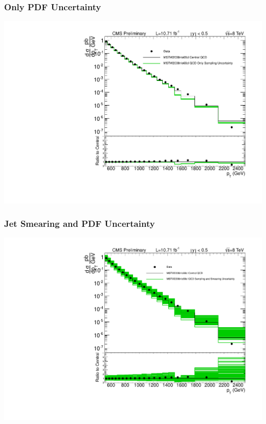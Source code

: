 \documentclass{beamer}
\begin{document}
\begin{frame}
	\frametitle{Only PDF Uncertainty}
	\begin{*figure}
\begin{center}
 \vspace {0.05 in}
 \includegraphics [width=0.7\linewidth] {xsec_MSTW_QCD_only_sampling.pdf}
 \vspace {0.05 in}
\caption{}
\end{center}
\end{*figure} 
\end{frame}

\begin{frame}
	\frametitle{Jet Smearing and PDF Uncertainty}
	\begin{*figure}
\begin{center}
 \vspace {0.05 in}
 \includegraphics [width=0.7\linewidth] {xsec_MSTW_QCD_sampled_and_smeared.pdf}
 \vspace {0.05 in}
\caption{ }
\end{center}
\end{*figure} 
\end{frame}
\end{document}
